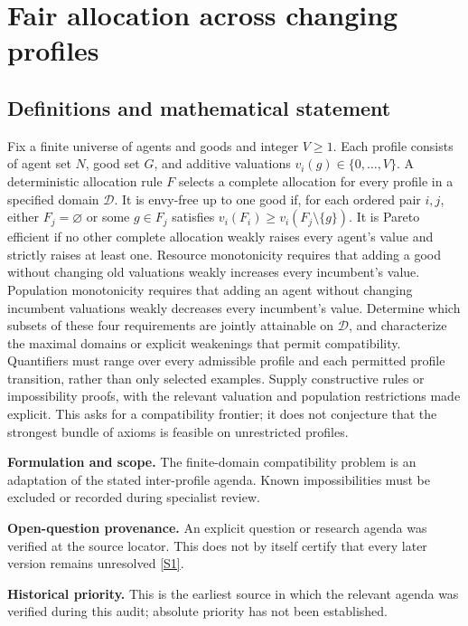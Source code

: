 \documentclass[11pt]{article}
\newcommand{\sref}[2]{\hyperlink{source:#1:#2}{[S#2]}}
\begin{document}
\section*{Fair allocation across changing profiles}\label{30007560}
\subsection{Definitions and mathematical statement}
Fix a finite universe of agents and goods and integer \(V\geq1\). Each profile consists of agent set \(N\), good set \(G\), and additive valuations \(v_i(g)\in\{0,\ldots,V\}\). A deterministic allocation rule \(F\) selects a complete allocation for every profile in a specified domain \(\mathcal D\). It is envy-free up to one good if, for each ordered pair \(i,j\), either \(F_j=\varnothing\) or some \(g\in F_j\) satisfies \(v_i(F_i)\geq v_i(F_j\setminus\{g\})\). It is Pareto efficient if no other complete allocation weakly raises every agent's value and strictly raises at least one. Resource monotonicity requires that adding a good without changing old valuations weakly increases every incumbent's value. Population monotonicity requires that adding an agent without changing incumbent valuations weakly decreases every incumbent's value. Determine which subsets of these four requirements are jointly attainable on \(\mathcal D\), and characterize the maximal domains or explicit weakenings that permit compatibility. Quantifiers must range over every admissible profile and each permitted profile transition, rather than only selected examples. Supply constructive rules or impossibility proofs, with the relevant valuation and population restrictions made explicit. This asks for a compatibility frontier; it does not conjecture that the strongest bundle of axioms is feasible on unrestricted profiles.

\par\textbf{Formulation and scope.} The finite-domain compatibility problem is an adaptation of the stated inter-profile agenda. Known impossibilities must be excluded or recorded during specialist review.

\par\textbf{Open-question provenance.} An explicit question or research agenda was verified at the source locator. This does not by itself certify that every later version remains unresolved \sref{30007560}{1}.

\par\textbf{Historical priority.} This is the earliest source in which the relevant agenda was verified during this audit; absolute priority has not been established.
\end{document}
